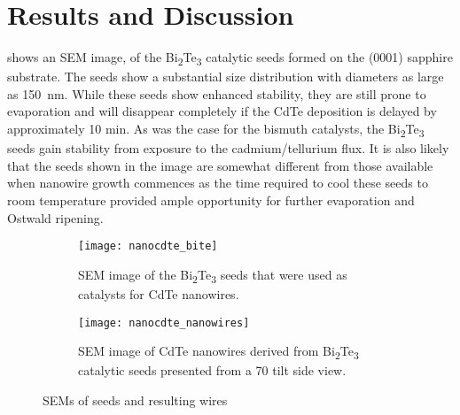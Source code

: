 \section{Results and Discussion}
 shows an SEM image, of the Bi\textsubscript{2}Te\textsubscript{3}
catalytic seeds formed on the (0001) sapphire substrate. The
seeds show a substantial size distribution with diameters
as large as 150~nm. While these seeds show enhanced
stability, they are still prone to evaporation and will disappear
completely if the CdTe deposition is delayed by approximately
10 min. As was the case for the bismuth catalysts, the Bi\textsubscript{2}Te\textsubscript{3}
seeds gain stability from exposure to the cadmium/tellurium
flux. It is also likely that the seeds shown in the image
are somewhat different from those available when nanowire
growth commences as the time required to cool these seeds
to room temperature provided ample opportunity for further
evaporation and Ostwald ripening.
\begin{figure}
    \centering
    \begin{subfigure}[t]{0.5\textwidth}
        \centering
        \texttt{[image: nanocdte\_bite]}
        \caption{\label{fig:nanocdte_bite}SEM image of the Bi\textsubscript{2}Te\textsubscript{3} seeds that were used as catalysts 
            for CdTe nanowires.}
    \end{subfigure}%
    \begin{subfigure}[t]{0.5\textwidth}
        \centering
        \texttt{[image: nanocdte\_nanowires]}
        \caption{\label{fig:nanocdte_nanowires} SEM image of CdTe nanowires derived from Bi\textsubscript{2}Te\textsubscript{3}
            catalytic seeds presented from a 70\degree{} tilt side view.}
    \end{subfigure}
    \caption{\label{fig:nanocdte_sem}SEMs of seeds and resulting wires}
\end{figure}

